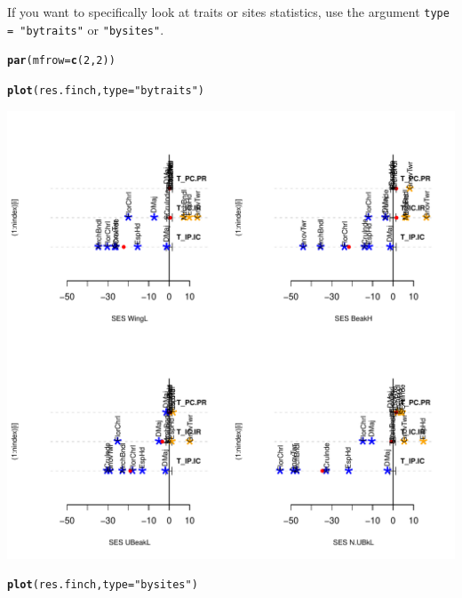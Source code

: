 \documentclass[12pt]{article}\usepackage[]{graphicx}\usepackage[]{color}
\makeatletter
\def\maxwidth{ %
  \ifdim\Gin@nat@width>\linewidth
    \linewidth
  \else
    \Gin@nat@width
  \fi
}
\newcommand{\hlnum}[1]{\textcolor[rgb]{0.686,0.059,0.569}{#1}}%
\newcommand{\hlstr}[1]{\textcolor[rgb]{0.192,0.494,0.8}{#1}}%
\newcommand{\hlstd}[1]{\textcolor[rgb]{0.345,0.345,0.345}{#1}}%
\newcommand{\hlkwc}[1]{\textcolor[rgb]{0.333,0.667,0.333}{#1}}%
\newcommand{\hlkwd}[1]{\textcolor[rgb]{0.737,0.353,0.396}{\textbf{#1}}}%
\newenvironment{kframe}{%
 \def\at@end@of@kframe{}%
 \ifinner\ifhmode%
  \def\at@end@of@kframe{\end{minipage}}%
  \begin{minipage}{\columnwidth}%
 \fi\fi%
 \def\FrameCommand##1{\hskip\@totalleftmargin \hskip-\fboxsep
 \colorbox{shadecolor}{##1}\hskip-\fboxsep
     \hskip-\linewidth \hskip-\@totalleftmargin \hskip\columnwidth}%
 \MakeFramed {\advance\hsize-\width
   \@totalleftmargin\z@ \linewidth\hsize
   \@setminipage}}%
 {\par\unskip\endMakeFramed%
 \at@end@of@kframe}
\newenvironment{knitrout}{}{} %
\makeatother
\begin{document}
If you want to specifically look at traits or sites statistics, use the argument \texttt{type = "bytraits"} or \texttt{"bysites"}.
\begin{knitrout}
\color{fgcolor}\begin{kframe}
\begin{alltt}
\hlkwd{par}\hlstd{(}\hlkwc{mfrow}\hlstd{=}\hlkwd{c}\hlstd{(}\hlnum{2}\hlstd{,}\hlnum{2}\hlstd{))}

\hlkwd{plot}\hlstd{(res.finch,} \hlkwc{type} \hlstd{=} \hlstr{"bytraits"}\hlstd{)}
\end{alltt}
\end{kframe}

{\centering \includegraphics[width=\maxwidth]{figure/unnamed-chunk-361} 

}


\begin{kframe}\begin{alltt}
\hlkwd{plot}\hlstd{(res.finch,} \hlkwc{type} \hlstd{=} \hlstr{"bysites"}\hlstd{)}
\end{alltt}
\end{kframe}


\end{knitrout}
\end{document}
